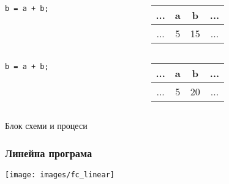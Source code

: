 \documentclass{beamer}
\begin{document}
\begin{frame}[fragile]
\begin{columns}[c]
\begin{column}{0.7\textwidth}
\begin{tabular}{ c | c | c | c}
\end{tabular}

  \end{column}
\end{columns}

\pause

\begin{columns}[c]
  \begin{column}{0.3\textwidth}
\begin{lstlisting}
b = a + b;
\end{lstlisting}

  \end{column}
  \begin{column}{0.7\textwidth}
\begin{tabular}{ c | c | c | c}
\hline
... & a & b &  ...\\\hline
... & 5 & \alert{15} & ... \\\hline
  
\end{tabular}

  \end{column}
\end{columns}

\pause

\begin{columns}[c]
  \begin{column}{0.3\textwidth}
\begin{lstlisting}
b = a + b;
\end{lstlisting}

  \end{column}
  \begin{column}{0.7\textwidth}
\begin{tabular}{ c | c | c | c}
\hline
... & a & b &  ...\\\hline
... & 5 & \alert{20} & ... \\\hline
  
\end{tabular}

  \end{column}
\end{columns}

\end{frame}


\begin{frame}
\centerline{Блок схеми и процеси}
\end{frame}


\begin{frame}[fragile]
\frametitle{Линейна програма}

\hspace*{-30pt}
\texttt{[image: images/fc\_linear]} 

\end{frame}
\end{document}
